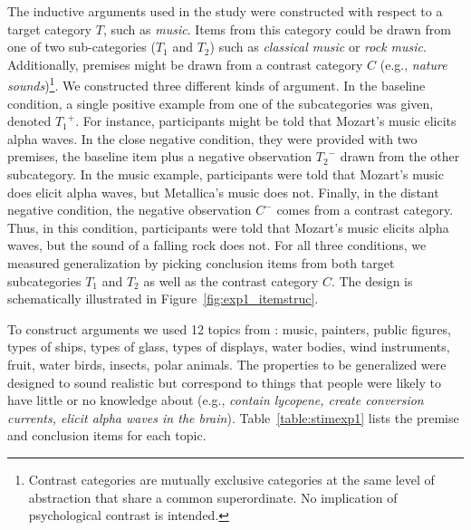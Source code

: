 \documentclass[authoryear,11pt]{elsarticle}
\begin{document}
The inductive arguments used in the study were constructed with respect to a target category $T$, such as {\it music}. Items from this category could be drawn from one of two sub-categories ($T_1$ and $T_2$) such as {\it classical music} or {\it rock music}. Additionally, premises might be drawn from a contrast category $C$ (e.g., {\it nature sounds})\footnote{Contrast categories are mutually exclusive categories at the same level of abstraction that share a common superordinate. No implication of psychological contrast is intended.}. We constructed three different kinds of argument. In the {\sc baseline} condition, a single positive example from one of the subcategories was given, denoted ${T_1}^+$. For instance, participants might be told that Mozart's music elicits alpha waves. In the {\sc close negative} condition, they were provided with two premises, the baseline item plus a negative observation ${T_2}^-$ drawn from the other subcategory. In the music example, participants were told that Mozart's music does elicit alpha waves, but Metallica's music does not. Finally, in the {\sc distant negative} condition, the negative observation $C^-$ comes from a contrast category. Thus, in this condition, participants were told that Mozart's music elicits alpha waves, but the sound of a falling rock does not.  For all three conditions, we measured generalization by picking conclusion items from both target subcategories $T_1$ and $T_2$ as well as the contrast category $C$. The design is schematically illustrated in Figure~\ref{fig:exp1_itemstruc}.

To construct arguments we used 12 topics from \citet{Heussenetal2011}: music, painters, public figures, types of ships, types of glass, types of displays, water bodies, wind instruments, fruit, water birds, insects, polar animals. The properties to be generalized were designed to sound realistic but correspond to things that people were likely to have little or no knowledge about (e.g., \textit{contain lycopene, create conversion currents, elicit alpha waves in the brain}). Table~\ref{table:stimexp1} lists the premise and conclusion items for each topic.
\end{document}

